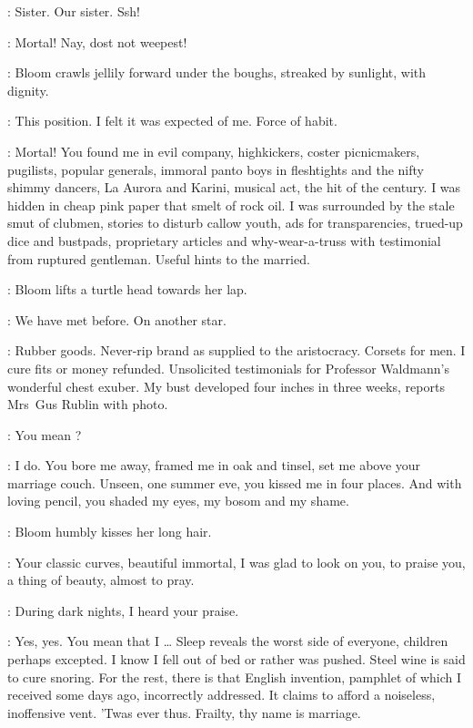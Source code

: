 \Yews:
Sister.
Our sister.
Ssh!

\Nymph[2]:
Mortal!
Nay, dost not weepest!

:
Bloom crawls jellily forward under the boughs,
streaked by sunlight, with dignity.

\Bloom:
This position.
I felt it was expected of me.
Force of habit.

\Nymph:
Mortal!
You found me in evil company, highkickers,
coster picnicmakers, pugilists, popular generals,
immoral panto boys in fleshtights and the nifty shimmy dancers,
La Aurora and Karini, musical act, the hit of the century.
I was hidden in cheap pink paper that smelt of rock oil.
I was surrounded by the stale smut of clubmen,
stories to disturb callow youth, ads for transparencies,
trued-up dice and bustpads, proprietary articles
and why-wear-a-truss with testimonial from ruptured gentleman.
Useful hints to the married.

:
Bloom lifts a turtle head towards her lap.

\Bloom:
We have met before.
On another star.

\Nymph:
Rubber goods.
Never-rip brand as supplied to the aristocracy.
Corsets for men.
I cure fits or money refunded.
Unsolicited testimonials for Professor Waldmann's wonderful chest exuber.
My bust developed four inches in three weeks, reports Mrs~Gus Rublin with photo.

\Bloom:
You mean ?

\Nymph:
I do.
You bore me away, framed me in oak and tinsel,
set me above your marriage couch.
Unseen, one summer eve, you kissed me in four places.
And with loving pencil, you shaded my eyes, my bosom and my shame.

:
Bloom humbly kisses her long hair.

\Bloom:
Your classic curves, beautiful immortal,
I was glad to look on you, to praise you, a thing of beauty,
almost to pray.

\Nymph:
During dark nights, I heard your praise.%

\Bloom:
Yes, yes.
You mean that I \ldots
Sleep reveals the worst side of everyone, children perhaps excepted.
I know I fell out of bed or rather was pushed.
Steel wine is said to cure snoring.
For the rest, there is that English invention,
pamphlet of which I received some days ago, incorrectly addressed.
It claims to afford a noiseless, inoffensive vent.
'Twas ever thus.
Frailty, thy name is marriage.

